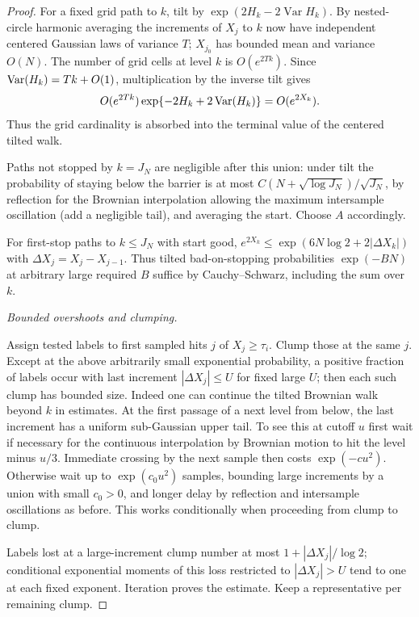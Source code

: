 \begin{proof}
For a fixed grid path to \(k\), tilt by \(\exp (2H_k-2\operatorname{Var}H_k)\). By nested-circle
harmonic averaging the increments of \(X_j\) to \(k\) now have independent centered Gaussian laws of
variance \(T\); \(X_{j_0}\) has bounded mean and variance \(O(N)\). The number of grid cells at level \(k\) is \(O(e^{2Tk})\).
Since \(\operatorname{Var}(H_k)=Tk+O(1)\), multiplication by the inverse tilt gives
\[
 O(e^{2Tk})\exp\{-2H_k+2\operatorname{Var}(H_k)\}
       =O(e^{2X_k}).
\]
Thus the grid cardinality is absorbed into the terminal value of the
centered tilted walk.

Paths not stopped by \(k=J_N\) are negligible after this union: under tilt the probability of
staying below the barrier is at most \(C(N+\sqrt {\log J_N})/\sqrt {J_N}\), by reflection for the
Brownian interpolation allowing the maximum intersample oscillation (add a negligible tail), and
averaging the start. Choose \(A\) accordingly.

For first-stop paths to \(k\le J_N\) with start good, \(e^{2X_k}\le \exp (6N\log 2+2|\Delta X_k|)\)
with \(\Delta X_j=X_j-X_{j-1}\). Thus tilted bad-on-stopping probabilities \(\exp (-B N)\) at
arbitrary large required \(B\) suffice by Cauchy–Schwarz, including the sum over \(k\).

\smallskip\noindent\emph{Bounded overshoots and clumping.}\par

Assign tested labels to first sampled hits \(j\) of \(X_j\ge \tau _i\). Clump those at the same
\(j\). Except at the above arbitrarily small exponential probability, a positive fraction of labels
occur with last increment \(|\Delta X_j|\le U\) for fixed large \(U\); then each such clump has
bounded size. Indeed one can continue the tilted Brownian walk beyond \(k\) in estimates. At the
first passage of a next level from below, the last increment has a uniform sub-Gaussian upper tail.
To see this at cutoff \(u\) first wait if necessary for the continuous interpolation by Brownian
motion to hit the level minus \(u/3\). Immediate crossing by the next sample then costs \(\exp (-c
u^2)\). Otherwise wait up to \(\exp (c_0u^2)\) samples, bounding large increments by a union with
small \(c_0>0\), and longer delay by reflection and intersample oscillations as before. This works
conditionally when proceeding from clump to clump.

Labels lost at a large-increment clump number at most \(1+|\Delta X_j|/\log 2\); conditional
exponential moments of this loss restricted to \(|\Delta X_j|>U\) tend to one at each fixed
exponent. Iteration proves the estimate. Keep a representative per remaining clump.


\end{proof}
